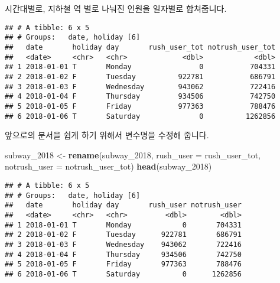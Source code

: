 \documentclass[]{article}
\newenvironment{Shaded}{\begin{snugshade}}{\end{snugshade}}
\newcommand{\KeywordTok}[1]{\textcolor[rgb]{0.13,0.29,0.53}{\textbf{#1}}}
\newcommand{\DataTypeTok}[1]{\textcolor[rgb]{0.13,0.29,0.53}{#1}}
\newcommand{\DecValTok}[1]{\textcolor[rgb]{0.00,0.00,0.81}{#1}}
\newcommand{\StringTok}[1]{\textcolor[rgb]{0.31,0.60,0.02}{#1}}
\newcommand{\OperatorTok}[1]{\textcolor[rgb]{0.81,0.36,0.00}{\textbf{#1}}}
\newcommand{\NormalTok}[1]{#1}
\begin{document}
시간대별로, 지하철 역 별로 나눠진 인원을 일자별로 합쳐줍니다.

\begin{Shaded}
\end{Shaded}

\begin{verbatim}
## # A tibble: 6 x 5
## # Groups:   date, holiday [6]
##   date       holiday day       rush_user_tot notrush_user_tot
##   <date>     <chr>   <chr>             <dbl>            <dbl>
## 1 2018-01-01 T       Monday                0           704331
## 2 2018-01-02 F       Tuesday          922781           686791
## 3 2018-01-03 F       Wednesday        943062           722416
## 4 2018-01-04 F       Thursday         934506           742750
## 5 2018-01-05 F       Friday           977363           788476
## 6 2018-01-06 T       Saturday              0          1262856
\end{verbatim}

앞으로의 분서을 쉽게 하기 위해서 변수명을 수정해 줍니다.

\begin{Shaded}
\begin{Highlighting}[]
\NormalTok{subway_}\DecValTok{2018}\NormalTok{ <-}\StringTok{ }\KeywordTok{rename}\NormalTok{(subway_}\DecValTok{2018}\NormalTok{,}
                      \DataTypeTok{rush_user =}\NormalTok{ rush_user_tot,}
                      \DataTypeTok{notrush_user =}\NormalTok{ notrush_user_tot)}
\KeywordTok{head}\NormalTok{(subway_}\DecValTok{2018}\NormalTok{)}
\end{Highlighting}
\end{Shaded}

\begin{verbatim}
## # A tibble: 6 x 5
## # Groups:   date, holiday [6]
##   date       holiday day       rush_user notrush_user
##   <date>     <chr>   <chr>         <dbl>        <dbl>
## 1 2018-01-01 T       Monday            0       704331
## 2 2018-01-02 F       Tuesday      922781       686791
## 3 2018-01-03 F       Wednesday    943062       722416
## 4 2018-01-04 F       Thursday     934506       742750
## 5 2018-01-05 F       Friday       977363       788476
## 6 2018-01-06 T       Saturday          0      1262856
\end{verbatim}
\end{document}
